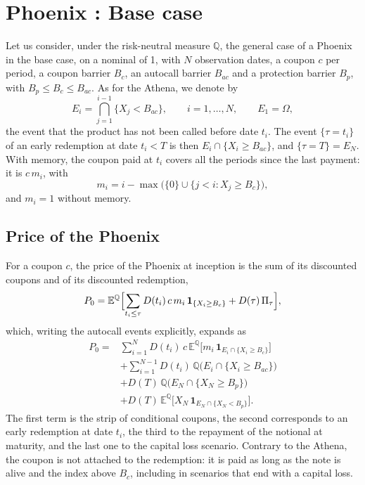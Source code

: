 \documentclass[11pt,a4paper]{article}
\newcommand{\ind}{\mathbf{1}}
\begin{document}
\clearpage
\section{Phoenix : Base case}\label{sec:phoenix}


Let us consider, under the risk-neutral measure $\mathbb{Q}$, the general
case of a Phoenix in the base case, on a nominal of 1, with $N$ observation
dates, a coupon $c$ per period, a coupon barrier $B_c$, an autocall barrier
$B_{ac}$ and a protection barrier $B_p$, with $B_p \le B_c \le B_{ac}$. As
for the Athena, we denote by
\begin{equation}
  E_i = \bigcap_{j=1}^{i-1} \{X_j < B_{ac}\}, \qquad i = 1, \dots, N,
  \qquad E_1 = \Omega,
\end{equation}
the event that the product has not been called before date $t_i$. The
event $\{\tau = t_i\}$ of an early redemption at date $t_i < T$ is then
$E_i \cap \{X_i \geq B_{ac}\}$, and $\{\tau = T\} = E_N$. With memory, the
coupon paid at $t_i$ covers all the periods since the last payment: it is
$c\, m_i$, with
\begin{equation}
  m_i = i - \max\bigl(\{0\} \cup \{ j < i : X_j \ge B_c \}\bigr),
\end{equation}
and $m_i = 1$ without memory.

\subsection{Price of the Phoenix}

For a coupon $c$, the price of the Phoenix at inception is the sum of its
discounted coupons and of its discounted redemption,
\begin{equation}
  P_0 = \mathbb{E}^{\mathbb{Q}}\Bigl[ \sum_{t_i \le \tau} D(t_i)\, c\, m_i\,
        \ind_{\{X_i \ge B_c\}} + D(\tau)\, \Pi_\tau \Bigr],
\end{equation}
which, writing the autocall events explicitly, expands as
\begin{align}
  P_0 = {}& \sum_{i=1}^{N} D(t_i)\, c\,
          \mathbb{E}^{\mathbb{Q}}\bigl[ m_i\, \ind_{E_i \cap \{X_i \geq B_c\}} \bigr] \nonumber \\
        & + \sum_{i=1}^{N-1} D(t_i)\,
          \mathbb{Q}\bigl( E_i \cap \{X_i \geq B_{ac}\} \bigr) \nonumber \\
        & + D(T)\,
          \mathbb{Q}\bigl( E_N \cap \{X_N \geq B_p\} \bigr) \nonumber \\
        & + D(T)\,
          \mathbb{E}^{\mathbb{Q}}\bigl[ X_N \, \ind_{E_N \cap \{X_N < B_p\}} \bigr].
  \label{eq:phoenix-price-explicit}
\end{align}
The first term is the strip of conditional coupons, the second corresponds
to an early redemption at date $t_i$, the third to the repayment of the
notional at maturity, and the last one to the capital loss scenario.
Contrary to the Athena, the coupon is not attached to the redemption: it is
paid as long as the note is alive and the index above $B_c$, including in
scenarios that end with a capital loss.
\end{document}
